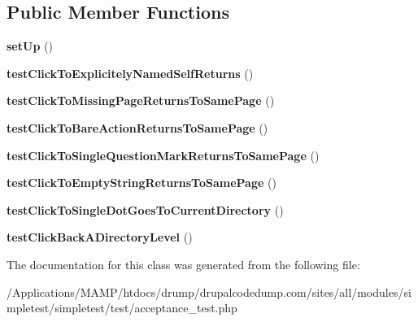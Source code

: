\subsection*{Public Member Functions}
\begin{DoxyCompactItemize}
\item 
\hypertarget{class_test_of_live_page_linking_with_minimal_links_ae16ca325701c2621e34dcdf0883f41a2}{
{\bfseries setUp} ()}
\label{class_test_of_live_page_linking_with_minimal_links_ae16ca325701c2621e34dcdf0883f41a2}

\item 
\hypertarget{class_test_of_live_page_linking_with_minimal_links_aa7ed37a8da5518daf0591aba99735663}{
{\bfseries testClickToExplicitelyNamedSelfReturns} ()}
\label{class_test_of_live_page_linking_with_minimal_links_aa7ed37a8da5518daf0591aba99735663}

\item 
\hypertarget{class_test_of_live_page_linking_with_minimal_links_a4795242f4d3774c99365ca1fd30c1698}{
{\bfseries testClickToMissingPageReturnsToSamePage} ()}
\label{class_test_of_live_page_linking_with_minimal_links_a4795242f4d3774c99365ca1fd30c1698}

\item 
\hypertarget{class_test_of_live_page_linking_with_minimal_links_acfd249820e1704581a009726d09c40cf}{
{\bfseries testClickToBareActionReturnsToSamePage} ()}
\label{class_test_of_live_page_linking_with_minimal_links_acfd249820e1704581a009726d09c40cf}

\item 
\hypertarget{class_test_of_live_page_linking_with_minimal_links_a6241d5b6cca70d7ffbf94d772099de22}{
{\bfseries testClickToSingleQuestionMarkReturnsToSamePage} ()}
\label{class_test_of_live_page_linking_with_minimal_links_a6241d5b6cca70d7ffbf94d772099de22}

\item 
\hypertarget{class_test_of_live_page_linking_with_minimal_links_a50d9afe8bb3d7aaef8f9af173fe92d89}{
{\bfseries testClickToEmptyStringReturnsToSamePage} ()}
\label{class_test_of_live_page_linking_with_minimal_links_a50d9afe8bb3d7aaef8f9af173fe92d89}

\item 
\hypertarget{class_test_of_live_page_linking_with_minimal_links_ad434cba0ac45249fd91a8e83554a328a}{
{\bfseries testClickToSingleDotGoesToCurrentDirectory} ()}
\label{class_test_of_live_page_linking_with_minimal_links_ad434cba0ac45249fd91a8e83554a328a}

\item 
\hypertarget{class_test_of_live_page_linking_with_minimal_links_a67dbe5fbb3a70d6c283dbefe843b6c42}{
{\bfseries testClickBackADirectoryLevel} ()}
\label{class_test_of_live_page_linking_with_minimal_links_a67dbe5fbb3a70d6c283dbefe843b6c42}

\end{DoxyCompactItemize}


The documentation for this class was generated from the following file:\begin{DoxyCompactItemize}
\item 
/Applications/MAMP/htdocs/drump/drupalcodedump.com/sites/all/modules/simpletest/simpletest/test/acceptance\_\-test.php\end{DoxyCompactItemize}
